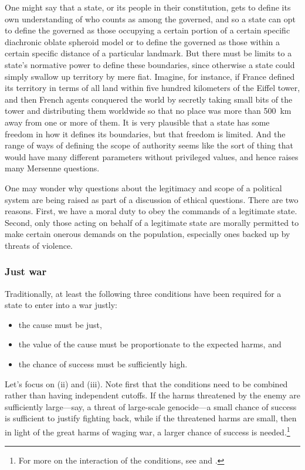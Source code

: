One might say that a state, or its people in their constitution, gets to define 
its own understanding of who counts as among the governed, and so a state can opt to define the governed as those occupying a 
certain portion of a certain specific diachronic oblate spheroid model or to define the governed as those within a certain specific
distance of a particular landmark. But there must be limits to a state's normative power to define these boundaries, since otherwise
a state could simply swallow up territory by mere fiat. Imagine, for instance, if France defined its territory in terms of all land
within five hundred kilometers of the Eiffel tower, and then French agents conquered the world by secretly taking small bits
of the tower and distributing them worldwide so that no place was more than 500~km away from one or more of them. It is very plausible
that a state has some freedom in how it defines its boundaries, but that freedom is limited. And the range of ways of defining the
scope of authority seems like the sort of thing that would have many different parameters without privileged values, and hence 
raises many Mersenne questions.

One may wonder why questions about the legitimacy and scope of a political system are being raised as part of a discussion of ethical
questions. There are two reasons. First, we have a moral duty to obey the commands of a legitimate state. Second, only those
acting on behalf of a legitimate state are morally permitted to make certain onerous demands on the population, especially ones backed up 
by threats of violence.  

\subsubsection{Just war}
Traditionally, at least the following three conditions have been required for a state to enter into a war justly: 
\begin{itemize}
\item[(i)] the cause must be just,
\item[(ii)] the value of the cause must be proportionate to the expected harms, and 
\item[(iii)] the chance of success must be 
sufficiently high. 
\end{itemize}

Let's focus on (ii) and (iii). Note first that the conditions need to be combined rather than having independent cutoffs. If the harms threatened by the enemy are sufficiently large---say, a threat of large-scale genocide---a small chance of success is sufficient to justify fighting back, while if the threatened harms are small, then in light of the 
great harms of waging war, a larger chance of success is needed.\footnote{For more on the interaction of the conditions,
see  and .}

